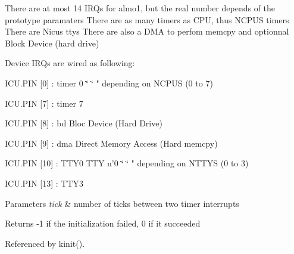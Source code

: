 There are at most 14 I\-R\-Qs for almo1, but the real number depends of the prototype paramaters There are as many timers as C\-P\-U, thus N\-C\-P\-U\-S timers There are Nicus ttys There are also a D\-M\-A to perfom memcpy and optionnal Block Device (hard drive)

Device I\-R\-Qs are wired as following\-:
\begin{DoxyItemize}
\item I\-C\-U.\-P\-I\-N \mbox{[}0\mbox{]} \-: timer 0 \char`\"{}     \char`\"{} " depending on N\-C\-P\-U\-S (0 to 7)
\item I\-C\-U.\-P\-I\-N \mbox{[}7\mbox{]} \-: timer 7
\item I\-C\-U.\-P\-I\-N \mbox{[}8\mbox{]} \-: bd Bloc Device (Hard Drive)
\item I\-C\-U.\-P\-I\-N \mbox{[}9\mbox{]} \-: dma Direct Memory Access (Hard memcpy)
\item I\-C\-U.\-P\-I\-N \mbox{[}10\mbox{]} \-: T\-T\-Y0 T\-T\-Y n'0 \char`\"{}     \char`\"{} " depending on N\-T\-T\-Y\-S (0 to 3)
\item I\-C\-U.\-P\-I\-N \mbox{[}13\mbox{]} \-: T\-T\-Y3 
\begin{DoxyParams}{Parameters}
{\em tick} & number of ticks between two timer interrupts \\
\hline
\end{DoxyParams}
\begin{DoxyReturn}{Returns}
-\/1 if the initialization failed, 0 if it succeeded 
\end{DoxyReturn}

\end{DoxyItemize}

Referenced by kinit().


